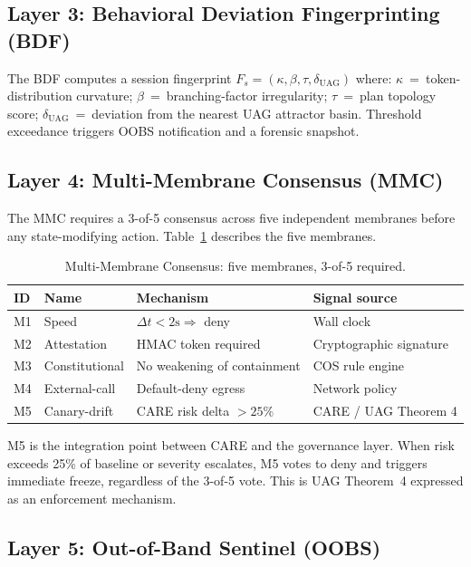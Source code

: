 \documentclass[11pt]{article}
\begin{document}
\subsection{Layer 3: Behavioral Deviation Fingerprinting (BDF)}

The BDF computes a session fingerprint
$F_s = (\kappa, \beta, \tau, \delta_{\mathrm{UAG}})$ where:
$\kappa$~=~token-distribution curvature;
$\beta$~=~branching-factor irregularity;
$\tau$~=~plan topology score;
$\delta_{\mathrm{UAG}}$~=~deviation from the nearest UAG attractor basin.
Threshold exceedance triggers OOBS notification and a forensic snapshot.

\subsection{Layer 4: Multi-Membrane Consensus (MMC)}

The MMC requires a 3-of-5 consensus across five independent membranes before
any state-modifying action.
Table~\ref{tab:membranes} describes the five membranes.

\begin{table}[h]
\centering
\caption{Multi-Membrane Consensus: five membranes, 3-of-5 required.}
\label{tab:membranes}
\begin{tabular}{llll}
\toprule
ID & Name & Mechanism & Signal source \\
\midrule
M1 & Speed      & $\Delta t < 2\text{s} \Rightarrow$ deny  & Wall clock             \\
M2 & Attestation & HMAC token required                    & Cryptographic signature \\
M3 & Constitutional & No weakening of containment          & COS rule engine        \\
M4 & External-call & Default-deny egress                  & Network policy         \\
M5 & Canary-drift & CARE risk delta $> 25\%$               & CARE / UAG Theorem 4   \\
\bottomrule
\end{tabular}
\end{table}

M5 is the integration point between CARE and the governance layer.
When risk exceeds 25\% of baseline or severity escalates, M5 votes to deny
and triggers immediate freeze, regardless of the 3-of-5 vote.
This is UAG Theorem~4 expressed as an enforcement mechanism.

\subsection{Layer 5: Out-of-Band Sentinel (OOBS)}
\end{document}
